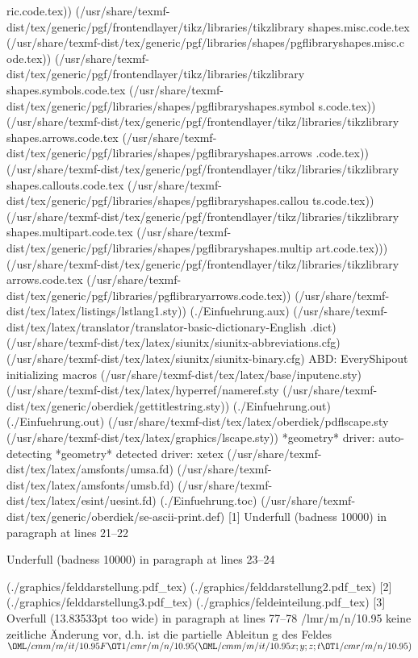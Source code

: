 ric.code.tex))
(/usr/share/texmf-dist/tex/generic/pgf/frontendlayer/tikz/libraries/tikzlibrary
shapes.misc.code.tex
(/usr/share/texmf-dist/tex/generic/pgf/libraries/shapes/pgflibraryshapes.misc.c
ode.tex))
(/usr/share/texmf-dist/tex/generic/pgf/frontendlayer/tikz/libraries/tikzlibrary
shapes.symbols.code.tex
(/usr/share/texmf-dist/tex/generic/pgf/libraries/shapes/pgflibraryshapes.symbol
s.code.tex))
(/usr/share/texmf-dist/tex/generic/pgf/frontendlayer/tikz/libraries/tikzlibrary
shapes.arrows.code.tex
(/usr/share/texmf-dist/tex/generic/pgf/libraries/shapes/pgflibraryshapes.arrows
.code.tex))
(/usr/share/texmf-dist/tex/generic/pgf/frontendlayer/tikz/libraries/tikzlibrary
shapes.callouts.code.tex
(/usr/share/texmf-dist/tex/generic/pgf/libraries/shapes/pgflibraryshapes.callou
ts.code.tex))
(/usr/share/texmf-dist/tex/generic/pgf/frontendlayer/tikz/libraries/tikzlibrary
shapes.multipart.code.tex
(/usr/share/texmf-dist/tex/generic/pgf/libraries/shapes/pgflibraryshapes.multip
art.code.tex)))
(/usr/share/texmf-dist/tex/generic/pgf/frontendlayer/tikz/libraries/tikzlibrary
arrows.code.tex
(/usr/share/texmf-dist/tex/generic/pgf/libraries/pgflibraryarrows.code.tex))
(/usr/share/texmf-dist/tex/latex/listings/lstlang1.sty)) (./Einfuehrung.aux)
(/usr/share/texmf-dist/tex/latex/translator/translator-basic-dictionary-English
.dict) (/usr/share/texmf-dist/tex/latex/siunitx/siunitx-abbreviations.cfg)
(/usr/share/texmf-dist/tex/latex/siunitx/siunitx-binary.cfg)
ABD: EveryShipout initializing macros
(/usr/share/texmf-dist/tex/latex/base/inputenc.sty)
(/usr/share/texmf-dist/tex/latex/hyperref/nameref.sty
(/usr/share/texmf-dist/tex/generic/oberdiek/gettitlestring.sty))
(./Einfuehrung.out) (./Einfuehrung.out)
(/usr/share/texmf-dist/tex/latex/oberdiek/pdflscape.sty
(/usr/share/texmf-dist/tex/latex/graphics/lscape.sty))
*geometry* driver: auto-detecting
*geometry* detected driver: xetex
(/usr/share/texmf-dist/tex/latex/amsfonts/umsa.fd)
(/usr/share/texmf-dist/tex/latex/amsfonts/umsb.fd)
(/usr/share/texmf-dist/tex/latex/esint/uesint.fd) (./Einfuehrung.toc)
(/usr/share/texmf-dist/tex/generic/oberdiek/se-ascii-print.def) [1]
Underfull \hbox (badness 10000) in paragraph at lines 21--22


Underfull \hbox (badness 10000) in paragraph at lines 23--24

(./graphics/felddarstellung.pdf_tex) (./graphics/felddarstellung2.pdf_tex)
[2] (./graphics/felddarstellung3.pdf_tex) (./graphics/feldeinteilung.pdf_tex)
[3]
Overfull \hbox (13.83533pt too wide) in paragraph at lines 77--78
\TU/lmr/m/n/10.95 keine zeitliche Änderung vor, d.h. ist die partielle Ableitun
g des Feldes $\OML/cmm/m/it/10.95 F\OT1/cmr/m/n/10.95 (\OML/cmm/m/it/10.95 x; y
; z; t\OT1/cmr/m/n/10.95 )$

